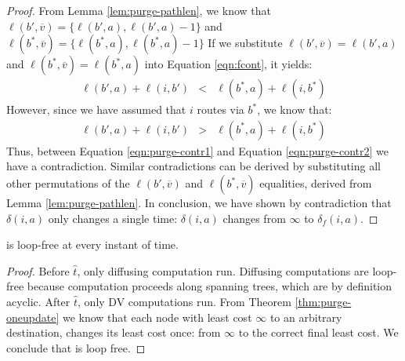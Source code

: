 {{\begin{proof}
From Lemma \ref{lem:purge-pathlen}, we know that $\ell(b',\overline{v}) = \{\ell(b',a), \ell(b',a) - 1\}$ and  $\ell(b^*,\overline{v}) = \{\ell(b^*,a), \ell(b^*,a) - 1\}$ 
If we substitute  $\ell(b',\overline{v}) = \ell(b',a)$ and $\ell(b^*,\overline{v}) = \ell(b^*,a)$ into Equation \ref{eqn:fcont}, it yields:
\begin{eqnarray}
\label{eqn:purge-contr1}
\ell(b',a) + \ell(i,b')  &<& \ell(b^*,a) + \ell(i,b^*) 
\end{eqnarray}
However, since we have assumed that $i$ routes via $b^*$, we know that: 
\begin{eqnarray}
\label{eqn:purge-contr2}
  \ell(b',a) + \ell(i,b')  &>& \ell(b^*,a) +  \ell(i,b^*) 
 \end{eqnarray}
Thus, between Equation \ref{eqn:purge-contr1} and Equation \ref{eqn:purge-contr2} we have a contradiction.
Similar contradictions can be derived by substituting all other permutations of the $\ell(b',\overline{v})$ and $\ell(b^*,\overline{v})$ equalities, derived from Lemma \ref{lem:purge-pathlen}.
In conclusion, we have shown by contradiction that $\delta(i,a)$ only changes a single time: $\delta(i,a)$ changes from $\infty$ to $\delta_f(i,a)$.
\end{proof}


\begin{corollary}
\purge is loop-free at every instant of time.
\end{corollary}

\begin{proof}
Before $\hat{t}$, only diffusing computation run. Diffusing computations are loop-free because computation proceeds along spanning trees, which are by definition acyclic. 
After $\hat{t}$, only DV computations run. From Theorem \ref{thm:purge-oneupdate} we know that each node with least cost $\infty$ to an arbitrary destination, changes its least cost once:
from $\infty$ to the correct final least cost. We conclude that \purge is loop free.
\end{proof}


}}
